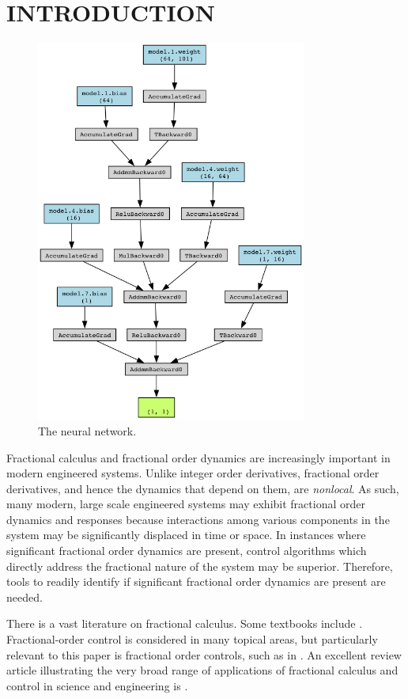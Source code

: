 \section{INTRODUCTION}

  \begin{figure}
  \centering
  \includegraphics[width=3.5in]{viz.png}
  \caption{The neural network.}
  \label{fig:thennet}
  \end{figure}


  Fractional calculus and fractional order dynamics are increasingly important
  in modern engineered systems. Unlike integer order derivatives, fractional
  order derivatives, and hence the dynamics that depend on them, are
  \emph{nonlocal}. As such, many modern, large scale engineered systems may
  exhibit fractional order dynamics and responses because interactions among
  various components in the system may be significantly displaced in time or
  space. In instances where significant fractional order dynamics are present,
  control algorithms which directly address the fractional nature of the system
  may be superior.  Therefore, tools to readily identify if significant
  fractional order dynamics are present are needed.

  There is a vast literature on fractional calculus. Some textbooks include
  \cite{fracbook,fracbook2,oustaloup}.  Fractional-order control is considered
  in many topical areas, but particularly relevant to this paper is fractional
  order controls, such as in \cite{fraccontrol,YQChenAcc}. An excellent review
  article illustrating the very broad range of applications of fractional
  calculus and control in science and engineering is \cite{SUN2018213}.


